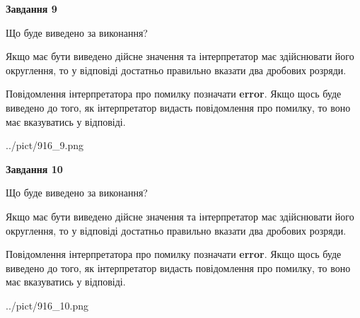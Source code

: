 \documentclass[12pt, ukrainian]{article}
\begin{document}
{\begin {Large}
{\begin {center}\textbf{Завдання 9}\end {center}}\par
Що буде виведено за виконання? \par

Якщо має бути виведено дійсне значення та інтерпретатор має здійснювати його округлення, 
то у відповіді достатньо правильно вказати два дробових розряди.

Повідомлення інтерпретатора про помилку позначати \textbf{error}.
Якщо щось буде виведено до того, як інтерпретатор видасть повідомлення про помилку, 
то воно має вказуватись у відповіді. \par

\begin{center}
	{../pict/916_9.png}
\end{center}
\newpage

{\begin {center}\textbf{Завдання 10}\end {center}}\par
Що буде виведено за виконання? \par

Якщо має бути виведено дійсне значення та інтерпретатор має здійснювати його округлення, 
то у відповіді достатньо правильно вказати два дробових розряди.

Повідомлення інтерпретатора про помилку позначати \textbf{error}.
Якщо щось буде виведено до того, як інтерпретатор видасть повідомлення про помилку, 
то воно має вказуватись у відповіді. \par

\begin{center}
	{../pict/916_10.png}
\end{center}
\newpage

\end {Large}}
\end{document}
